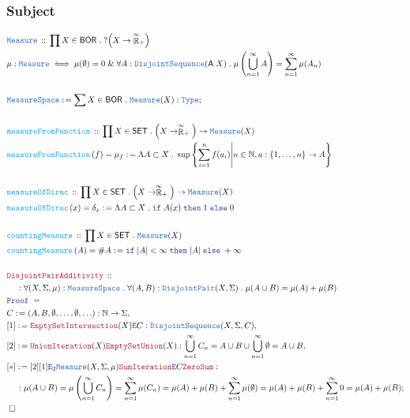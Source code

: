 \documentclass[12pt]{scrartcl}
\newcommand{\TYPE}[1]{\textcolor{NavyBlue}{\mathtt{#1}}}
\newcommand{\FUNC}[1]{\textcolor{Cerulean}{\mathtt{#1}}}
\newcommand{\LOGIC}[1]{\textcolor{Blue}{\mathtt{#1}}}
\newcommand{\THM}[1]{\textcolor{Maroon}{\mathtt{#1}}}
\renewcommand{\.}{\; . \;}
\newcommand{\de}{: \kern 0.1pc =}
\newcommand{\If}{\LOGIC{if} \;}
\newcommand{\Then}{ \; \LOGIC{then} \;}
\newcommand{\Else}{\; \LOGIC{else} \;}
\newcommand{\Act}[1]{\left( #1 \right)}
\newcommand{\Theorem}[2]{& \THM{#1} \, :: \, #2 \\ & \Proof = \\ }
\newcommand{\DeclareType}[2]{& \TYPE{#1} \, :: \, #2 \\}
\newcommand{\DefineType}[3]{& #1 : \TYPE{#2} \iff #3 \\}
\newcommand{\DeclareFunc}[2]{& \FUNC{#1} \, :: \, #2 \\}
\newcommand{\DefineNamedFunc}[4]{&  \FUNC{#1}\Act{#2} = #3 \de #4 \\}
\newcommand{\NewLine}{\\ & \kern 1pc}
\newcommand{\Page}[1]{ \begin{align*} #1 \end{align*}   }
\renewcommand{\And}{\; \& \;}
\newcommand{\Elim}{\LOGIC{E}}
\newcommand{\Type}{\TYPE{Type}}
\newcommand{\Nat}{\mathbb{N} }
\newcommand{\EReals}{\stackrel{\mathclap{\infty}}{\mathbb{R}}}
\newcommand{\Say}[3]{& #1 \de #2 : #3, \\}
\newcommand{\Conclude}[3]{& #1 \de #2 : #3; \\}
\newcommand{\QED}{\; \square}
\newcommand{\EndProof}{& \QED \\}
\newcommand{\Proof}{\LOGIC{Proof} \; }
\newcommand{\SET}{\mathsf{SET}}
\newcommand{\alg}{\mathsf{A}}
\newcommand{\BOR}{\mathsf{BOR}}
\newcommand{\Measure}{\TYPE{Measure}}
\newcommand{\MS}{\TYPE{MeasureSpace}}
\begin{document}
\subsubsection{Subject}
\Page{
	\DeclareType{\Measure}{\prod X \in \BOR \. ?\Big(X \to {\EReals}_+\Big)}
	\DefineType{\mu}{\Measure}
	{
		\mu(\emptyset) = 0
		\And		
		\forall A : \TYPE{DisjointSequence}(\alg \; X) \. 
		\mu\left( \bigcup^\infty_{n=1} A \right) = \sum^\infty_{n=1} \mu(A_n) 
	}
	\\
	\Conclude{\MS}{\sum X \in \BOR \. \Measure(X)}{\Type}
	\\
	\DeclareFunc{measureFromFunction}
	{\prod X \in \SET \. \Big(X \to \EReals_+\Big) \to \Measure(X)}
	\DefineNamedFunc{measureFromFunction}{f}{\mu_f}
	{
		\Lambda A \subset X \. \sup \left\{ \sum^n_{i=1} f(a_i) \Bigg| n \in \Nat, 
		a :\{1,\ldots,n\} \to A  \right\}	
	}
	\\
	\DeclareFunc{measureOfDirac}
	{\prod X \in \SET \. \Big(X \to \EReals_+\Big) \to \Measure(X)}
	\DefineNamedFunc{measureOfDirac}{x}{\delta_x}
	{
		\Lambda A \subset X \. \If A(x) \Then 1 \Else 0	
	}
	\\
	\DeclareFunc{countingMeasure}
	{\prod X \in \SET \.  \Measure(X)}
	\DefineNamedFunc{countingMeasure}{A}{\# A}
	{
		\If |A| < \infty \Then  	|A| \Else +\infty
	}
	\\
	\Theorem{DisjointPairAdditivity}
	{
		\NewLine :		
		\forall (X,\Sigma,\mu) : \MS \.
		\forall (A,B) : \TYPE{DisjointPair}(X,\Sigma) \.
		\mu(A \cup B) = \mu(A) + \mu(B)
	}
	\Say{C}{(A,B,\emptyset,\ldots,\emptyset,\ldots)}{\Nat \to \Sigma}
	\Say{[1]}{\THM{EmptySetIntersection}(X)\Elim C}{\TYPE{DisjointSequence}(X,\Sigma,C)}
	\Say{[2]}{ \THM{UnionIteration}(X) \THM{EmptySetUnion}(X)}
	{
		\bigcup^\infty_{n=1} C_n = 
		A \cup B \cup \bigcup^\infty_{n=1} \emptyset = 
		A \cup B
	}
	\Conclude{[*]}{
		[2][1] 
		\Elim_2 \Measure(X,\Sigma,\mu) 
		\THM{SumIteration} \Elim C
		\THM{ZeroSum}
	}
	{
		\NewLine :		
		\mu(A \cup B) =
		\mu\left( \bigcup^\infty_{n=1} C_n \right) =
		\sum^\infty_{n=1} \mu(C_n) =
		\mu(A) + \mu(B) + \sum^\infty_{n=1} \mu(\emptyset) = 
		\mu(A) + \mu(B) + \sum^\infty_{n=1} 0 =
		\mu(A) + \mu(B)
	}
	\EndProof
}
\end{document}
